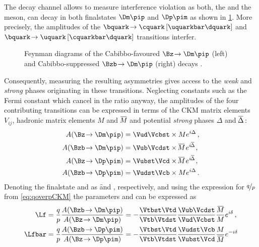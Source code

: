 The decay channel \BdToDpi allows to measure interference \CP violation as both, the \Bz and the \Bzb meson, can decay in both finalstates $\Dm\pip$ and $\Dp\pim$ as shown in \cref{fig:feynmanBd2Dpi}.
More precisely, the amplitudes of the $\bquark\!\to\cquark\left[\uquarkbar\dquark\right]$ and $\bquark\!\to\uquark\left[\cquarkbar\dquark\right]$ transitions interfer.
\begin{figure}[tbp]
	\centering
	
	
	\caption{Feynman diagrams of the Cabibbo-favoured $\Bz\!\to\Dm\pip$ (left) and Cabibbo-suppressed $\Bzb\!\to\Dm\pip$ (right) decays \cite{Ellis:2016jkw}.}
	\label{fig:feynmanBd2Dpi}
\end{figure}
Consequently, measuring the resulting \CP asymmetries gives access to the \emph{weak} and \emph{strong} phases originating in these transitions.
Neglecting constants such as the Fermi constant which cancel in the ratio anyway, the amplitudes of the four contributing transitions can be expressed in terms of the CKM matrix elements $V_{ij}^{\phantom{\ast}}$, hadronic matrix elements $M$ and $\overline{\kern -1.0pt M\kern -1.0pt}$ and potential \emph{strong} phases $\Delta$ and $\overline{\kern -1.0pt \Delta\kern -1.0pt}\,$:
\begin{align}
A\!\left(\Bz\!\to\Dm\pip\right)&=\Vud\Vcbst\times Me^{i\Delta}\,,\\
A\!\left(\Bzb\!\to\Dm\pip\right)&=\Vub\Vcdst\times \overline{\kern -1.0pt M\kern -1.0pt}\,e^{i\overline{\kern -1.0pt \Delta\kern -1.0pt}}\,,\\
A\!\left(\Bz\!\to\Dp\pim\right)&=\Vubst\Vcd\times \overline{\kern -1.0pt M\kern -1.0pt}\,e^{i\overline{\kern -1.0pt \Delta\kern -1.0pt}}\,,\\
A\!\left(\Bzb\!\to\Dp\pim\right)&=\Vudst\Vcb\times Me^{i\Delta}\,.
\end{align}
Denoting the finalstate \Dm\pip and \Dp\pim as \f and \fbar, respectively, and using the expression for $\nicefrac{q}{p}$ from \cref{eq:qoverpCKM} the parameters \Lf and \Lfbar can be expressed as
\begin{align}
\Lf&=\frac{q}{p}\frac{A\!\left(\Bzb\!\to\Dm\pip\right)}{A\!\left(\Bz\!\to\Dm\pip\right)}=-\frac{\Vtbst\Vtd}{\Vtb\Vtdst}\frac{\Vub\Vcdst}{\Vud\Vcbst}\frac{\overline{\kern -1.0pt M\kern -1.0pt}}{M}e^{i\delta}\,,\\
\Lfbar&=\frac{q}{p}\frac{A\!\left(\Bzb\!\to\Dp\pim\right)}{A\!\left(\Bz\!\to\Dp\pim\right)}=-\frac{\Vtbst\Vtd}{\Vtb\Vtdst}\frac{\Vudst\Vcb}{\Vubst\Vcd}\frac{M}{\overline{\kern -1.0pt M\kern -1.0pt}}e^{-i\delta}
\end{align}
